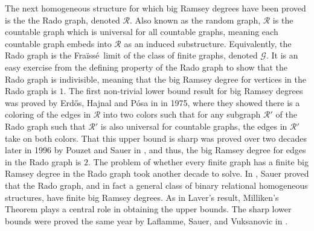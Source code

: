 \documentclass{amsart}
\theoremstyle{remark}
\theoremstyle{definition}
\theoremstyle{remark}
\newcommand{\Erdos}{Erd{\H{o}}s}
\newcommand{\Fraisse}{Fra{\"{i}}ss{\'{e}}}
\begin{document}
The next homogeneous structure for which big Ramsey degrees have been proved is the
the Rado graph, denoted
$\mathcal{R}$.
Also known as the random graph, $\mathcal{R}$ is the countable graph which
is universal for all countable graphs, meaning each countable graph embeds into $\mathcal{R}$ as an induced substructure.
Equivalently, the Rado graph is the \Fraisse\ limit of the  class of  finite graphs, denoted $\mathcal{G}$.
It is an easy exercise from the defining property of the Rado graph to show that  the Rado graph  is  indivisible, meaning that  the big Ramsey degree  for vertices in the Rado graph is $1$.
The first non-trivial lower bound result for big Ramsey degrees was proved by
\Erdos, Hajnal and P\'{o}sa in \cite{Erdos/Hajnal/Posa75} in 1975, where they
showed
there is a coloring of the edges in $\mathcal{R}$ into two colors such that for any subgraph $\mathcal{R}'$ of the Rado graph such that $\mathcal{R}'$ is also universal for countable graphs,
the  edges in $\mathcal{R}'$ take on both colors.
That this  upper bound is sharp was proved over two decades later in 1996 by Pouzet and Sauer
in \cite{Pouzet/Sauer96},
and thus,
 the big Ramsey degree for edges  in the Rado graph is $2$.
The problem
of whether every finite graph has a finite big Ramsey degree in the Rado graph
took another decade to solve.
In \cite{Sauer06},
Sauer
proved that the Rado graph, and in fact a  general class  of binary relational homogeneous structures,
have finite big Ramsey degrees.
As in Laver's result, Milliken's Theorem plays a  central role in  obtaining the upper bounds.
The sharp lower bounds were proved the same year  by Laflamme, Sauer, and Vuksanovic in \cite{Laflamme/Sauer/Vuksanovic06}.
\end{document}
